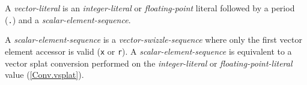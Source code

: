 \p A \textit{vector-literal} is an \textit{integer-literal} or
\textit{floating-point} literal followed by a period (\texttt{.}) and a
\textit{scalar-element-sequence}.

\p A \textit{scalar-element-sequence} is a \textit{vector-swizzle-sequence}
where only the first vector element accessor is valid (\texttt{x} or
\texttt{r}). A \textit{scalar-element-sequence} is equivalent to a vector splat
conversion performed on the \textit{integer-literal} or
\textit{floating-point-literal} value (\ref{Conv.vsplat}).

